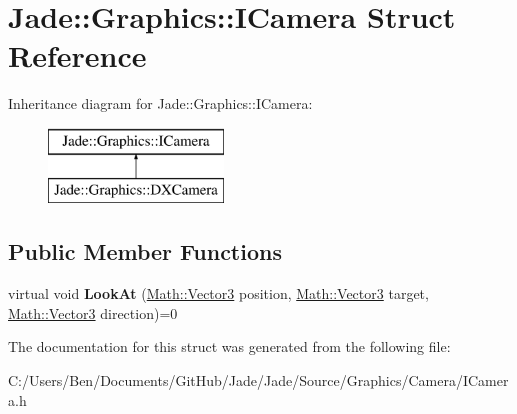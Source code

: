 \hypertarget{struct_jade_1_1_graphics_1_1_i_camera}{}\section{Jade\+:\+:Graphics\+:\+:I\+Camera Struct Reference}
\label{struct_jade_1_1_graphics_1_1_i_camera}
Inheritance diagram for Jade\+:\+:Graphics\+:\+:I\+Camera\+:\begin{figure}[H]
\begin{center}
\leavevmode
\includegraphics[height=2.000000cm]{struct_jade_1_1_graphics_1_1_i_camera}
\end{center}
\end{figure}
\subsection*{Public Member Functions}
\begin{DoxyCompactItemize}
\item 
\hypertarget{struct_jade_1_1_graphics_1_1_i_camera_a674c9df8c4203d7106cde3983e7ad865}{}virtual void {\bfseries Look\+At} (\hyperlink{struct_jade_1_1_math_1_1_vector3}{Math\+::\+Vector3} position, \hyperlink{struct_jade_1_1_math_1_1_vector3}{Math\+::\+Vector3} target, \hyperlink{struct_jade_1_1_math_1_1_vector3}{Math\+::\+Vector3} direction)=0\label{struct_jade_1_1_graphics_1_1_i_camera_a674c9df8c4203d7106cde3983e7ad865}

\end{DoxyCompactItemize}


The documentation for this struct was generated from the following file\+:\begin{DoxyCompactItemize}
\item 
C\+:/\+Users/\+Ben/\+Documents/\+Git\+Hub/\+Jade/\+Jade/\+Source/\+Graphics/\+Camera/I\+Camera.\+h\end{DoxyCompactItemize}

